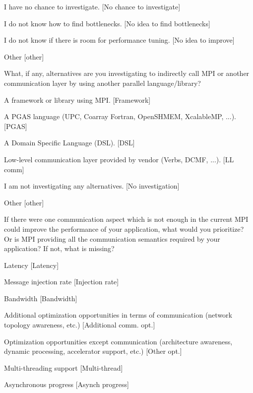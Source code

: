 \documentclass[conference,10pt,letterpaper]{IEEEtran}
\begin{document}
{{\begin{description}
\begin{inparaenum}
    \item I have no chance to investigate.
      [No chance to investigate]
    \item I do not know how to find bottlenecks.
      [No idea to find bottlenecks]
    \item I do not know if there is room for performance tuning.
      [No idea to improve]
    \item Other [other]
    \end{inparaenum}
  \item[Q24*:] What, if any, alternatives are you investigating to
    indirectly call MPI or another communication layer by using another
    parallel language/library? 
    \begin{inparaenum}[{\bf C}1)]
    \item A framework or library using MPI. [Framework]
    \item A PGAS language (UPC, Coarray Fortran, OpenSHMEM, XcalableMP,
      ...). [PGAS]
    \item A Domain Specific Language (DSL). [DSL]
    \item Low-level communication layer provided by vendor (Verbs, DCMF,
      ...). [LL comm]
    \item I am not investigating any alternatives. [No investigation]
    \item Other [other]
    \end{inparaenum}
  \item[Q25:] If there were one communication aspect which is not enough
    in the current MPI could improve the performance of your application,
    what would you prioritize? Or is MPI providing all the communication
    semantics required by your application? If not, what is missing? 
    \begin{inparaenum}[{\bf C}1)]
    \item Latency [Latency]
    \item Message injection rate [Injection rate]
    \item Bandwidth [Bandwidth]
    \item Additional optimization opportunities in terms of communication
      (network topology awareness, etc.) [Additional comm. opt.]
    \item Optimization opportunities except communication (architecture
      awareness, dynamic processing, accelerator support, etc.) [Other opt.]
    \item Multi-threading support [Multi-thread]
    \item Asynchronous progress [Asynch progress]

\end{inparaenum}
\end{description}}}
\end{document}
